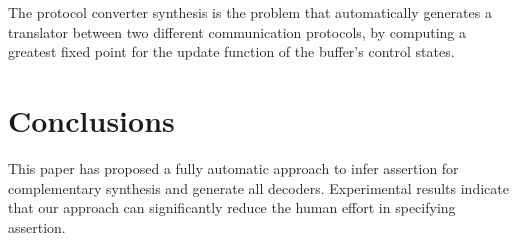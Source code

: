 \documentclass[journal]{IEEEtran}
\begin{document}
The protocol converter synthesis \cite{converter_date08} is the problem that automatically generates a translator between two different communication protocols,
by computing a greatest fixed point for the update function of the buffer's control states.



\section{Conclusions}\label{sec_conclude}

This paper has proposed a fully automatic approach to infer assertion for complementary synthesis and generate all decoders.
Experimental results indicate that our approach can significantly reduce the human effort in specifying assertion.


%
%
\end{document}

